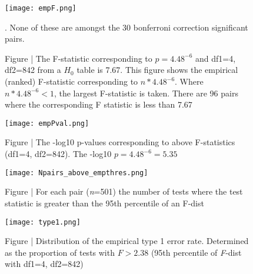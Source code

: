 \documentclass[paper=a4, fontsize=11pt]{scrartcl}         %
\numberwithin{equation}{section}                  %
\numberwithin{figure}{section}                    %
\numberwithin{table}{section}                   %
\begin{document}
\newpage

\begin{figure}[H]
\centering
\texttt{[image: empF.png]}
\caption*{Figure | The F-statistic corresponding to $p=4.48^{-6}$ and df1=4, df2=842 from a $H_0$ table is 7.67. This figure shows the empirical (ranked) F-statistic corresponding to $n * 4.48^{-6}$. Where $n * 4.48^{-6} < 1$, the largest F-statistic is taken. There are 96 pairs where the corresponding F statistic is less than 7.67}. None of these are amongst the 30 bonferroni correction significant pairs.
\end{figure}


\begin{figure}[H]
\centering
\texttt{[image: empPval.png]}
\caption*{Figure | The -log10 p-values corresponding to above F-statistics (df1=4, df2=842). The -log10 $p=4.48^{-6} = 5.35$}
\end{figure}



\newpage

\begin{figure}[H]
\centering
\texttt{[image: Npairs\_above\_empthres.png]}
\caption*{Figure | For each pair (\emph{n}=501) the number of tests where the test statistic is greater than the 95th percentile of an F-dist}
\end{figure}


\begin{figure}[H]
\centering
\texttt{[image: type1.png]}
\caption*{Figure | Distribution of the empirical type 1 error rate. Determined as the proportion of tests with $F > 2.38$ (95th percentile of \emph{F}-dist with df1=4, df2=842)}
\end{figure}


\newpage
\end{document}
